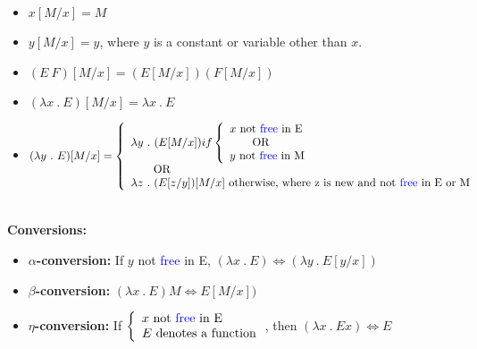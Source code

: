 \documentclass[11pt]{article}
\begin{document}
\begin{itemize}
    \item $x[M/x] = M$
    \item $y[M/x] = y$, where $y$ is a constant or variable other than $x$.
    \item $(E\ F)[M/x] = (E[M/x])(F[M/x])$
    \item $(\lambda x\ .\ E)[M/x] = \lambda x\ .\ E$
    \item $(\lambda y\ .\ E)[M/x] = 
            \left\{
                \begin{array}{ll}
                    \lambda y\ .\ (E[M/x]) if 
                                            \left\{
                                                \begin{array}{ll}
                                                    x \mbox{ not \textcolor{blue}{free} in E} \\
                                                    \ \ \ \ \ \ \mbox{OR} \\
                                                    y \mbox{ not \textcolor{blue}{free} in M}
                                                \end{array}
                                            \right. \\
                    \ \ \ \ \ \ \mbox{OR} \\
                    \lambda z\ .\ (E[z/y])[M/x] \mbox{ otherwise, where z is new and not \textcolor{blue}{free} in E or M}
                \end{array}
            \right.$
\end{itemize}
\\ \textbf{Conversions:}
\begin{itemize}
    \item \textbf{$\alpha$-conversion:} If $y$ not \textcolor{blue}{free} in E, $(\lambda x\ .\ E) \Leftrightarrow (\lambda y\ .\ E[y/x])$
    \item \textbf{$\beta$-conversion:} $(\lambda x\ .\ E)M \Leftrightarrow E[M/x])$
    \item \textbf{$\eta$-conversion:} If 
                                        $\left\{
                                            \begin{array}{ll}
                                                x \mbox{ not \textcolor{blue}{free} in E} \\
                                                E \mbox{ denotes a function}
                                            \end{array}
                                        \right.$, then $(\lambda x\ .\ Ex) \Leftrightarrow E$
\end{itemize}
\end{document}
